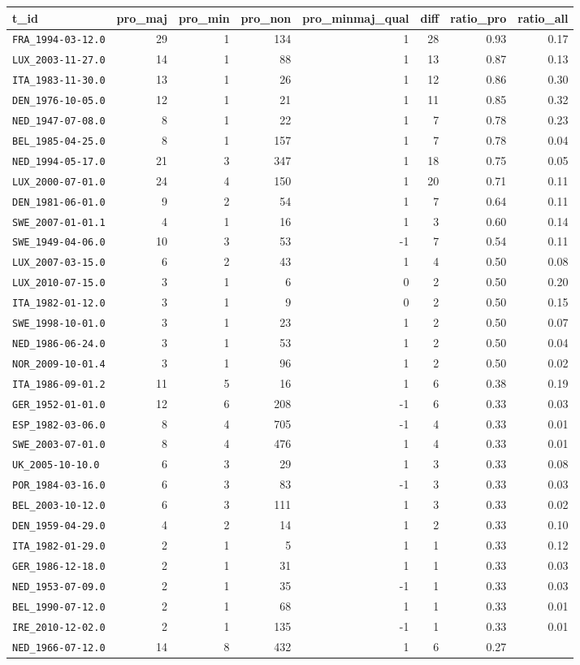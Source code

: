 \documentclass[]{article}
\begin{document}
\begin{longtable}[c]{@{}lrrrrrrr@{}}
\toprule
t\_id & pro\_maj & pro\_min & pro\_non & pro\_minmaj\_qual & diff &
ratio\_pro & ratio\_all\tabularnewline
\midrule
\endhead
\texttt{FRA\_1994-03-12.0} & 29 & 1 & 134 & 1 & 28 & 0.93 &
0.17\tabularnewline
\texttt{LUX\_2003-11-27.0} & 14 & 1 & 88 & 1 & 13 & 0.87 &
0.13\tabularnewline
\texttt{ITA\_1983-11-30.0} & 13 & 1 & 26 & 1 & 12 & 0.86 &
0.30\tabularnewline
\texttt{DEN\_1976-10-05.0} & 12 & 1 & 21 & 1 & 11 & 0.85 &
0.32\tabularnewline
\texttt{NED\_1947-07-08.0} & 8 & 1 & 22 & 1 & 7 & 0.78 &
0.23\tabularnewline
\texttt{BEL\_1985-04-25.0} & 8 & 1 & 157 & 1 & 7 & 0.78 &
0.04\tabularnewline
\texttt{NED\_1994-05-17.0} & 21 & 3 & 347 & 1 & 18 & 0.75 &
0.05\tabularnewline
\texttt{LUX\_2000-07-01.0} & 24 & 4 & 150 & 1 & 20 & 0.71 &
0.11\tabularnewline
\texttt{DEN\_1981-06-01.0} & 9 & 2 & 54 & 1 & 7 & 0.64 &
0.11\tabularnewline
\texttt{SWE\_2007-01-01.1} & 4 & 1 & 16 & 1 & 3 & 0.60 &
0.14\tabularnewline
\texttt{SWE\_1949-04-06.0} & 10 & 3 & 53 & -1 & 7 & 0.54 &
0.11\tabularnewline
\texttt{LUX\_2007-03-15.0} & 6 & 2 & 43 & 1 & 4 & 0.50 &
0.08\tabularnewline
\texttt{LUX\_2010-07-15.0} & 3 & 1 & 6 & 0 & 2 & 0.50 &
0.20\tabularnewline
\texttt{ITA\_1982-01-12.0} & 3 & 1 & 9 & 0 & 2 & 0.50 &
0.15\tabularnewline
\texttt{SWE\_1998-10-01.0} & 3 & 1 & 23 & 1 & 2 & 0.50 &
0.07\tabularnewline
\texttt{NED\_1986-06-24.0} & 3 & 1 & 53 & 1 & 2 & 0.50 &
0.04\tabularnewline
\texttt{NOR\_2009-10-01.4} & 3 & 1 & 96 & 1 & 2 & 0.50 &
0.02\tabularnewline
\texttt{ITA\_1986-09-01.2} & 11 & 5 & 16 & 1 & 6 & 0.38 &
0.19\tabularnewline
\texttt{GER\_1952-01-01.0} & 12 & 6 & 208 & -1 & 6 & 0.33 &
0.03\tabularnewline
\texttt{ESP\_1982-03-06.0} & 8 & 4 & 705 & -1 & 4 & 0.33 &
0.01\tabularnewline
\texttt{SWE\_2003-07-01.0} & 8 & 4 & 476 & 1 & 4 & 0.33 &
0.01\tabularnewline
\texttt{UK\_2005-10-10.0} & 6 & 3 & 29 & 1 & 3 & 0.33 &
0.08\tabularnewline
\texttt{POR\_1984-03-16.0} & 6 & 3 & 83 & -1 & 3 & 0.33 &
0.03\tabularnewline
\texttt{BEL\_2003-10-12.0} & 6 & 3 & 111 & 1 & 3 & 0.33 &
0.02\tabularnewline
\texttt{DEN\_1959-04-29.0} & 4 & 2 & 14 & 1 & 2 & 0.33 &
0.10\tabularnewline
\texttt{ITA\_1982-01-29.0} & 2 & 1 & 5 & 1 & 1 & 0.33 &
0.12\tabularnewline
\texttt{GER\_1986-12-18.0} & 2 & 1 & 31 & 1 & 1 & 0.33 &
0.03\tabularnewline
\texttt{NED\_1953-07-09.0} & 2 & 1 & 35 & -1 & 1 & 0.33 &
0.03\tabularnewline
\texttt{BEL\_1990-07-12.0} & 2 & 1 & 68 & 1 & 1 & 0.33 &
0.01\tabularnewline
\texttt{IRE\_2010-12-02.0} & 2 & 1 & 135 & -1 & 1 & 0.33 &
0.01\tabularnewline
\texttt{NED\_1966-07-12.0} & 14 & 8 & 432 & 1 & 6 & 0.27 &

\end{longtable}
\end{document}
